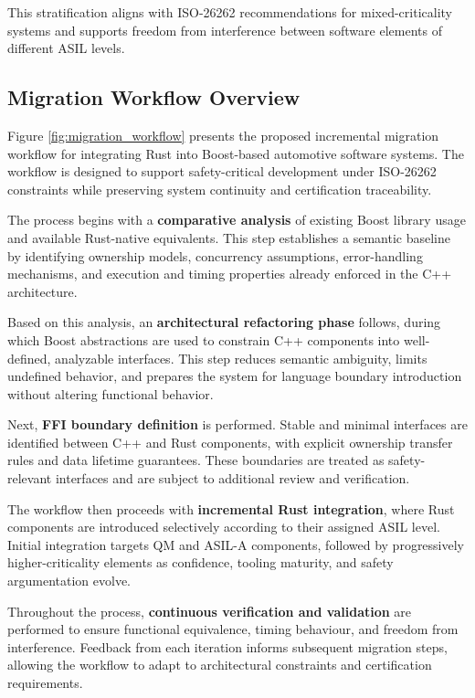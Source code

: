         This stratification aligns with ISO-26262 recommendations for mixed-criticality
        systems and supports freedom from interference between software elements of
        different ASIL levels.


        \subsection{Migration Workflow Overview}

        Figure \ref{fig:migration_workflow} presents the proposed incremental migration
        workflow for integrating Rust into Boost-based automotive software systems.
        The workflow is designed to support safety-critical development under
        ISO-26262 constraints while preserving system continuity and certification
        traceability.

        The process begins with a \textbf{comparative analysis} of existing Boost
        library usage and available Rust-native equivalents. This step establishes a
        semantic baseline by identifying ownership models, concurrency assumptions,
        error-handling mechanisms, and execution and timing properties already enforced in the
        C++ architecture.

        Based on this analysis, an \textbf{architectural refactoring phase} follows,
        during which Boost abstractions are used to constrain C++ components into
        well-defined, analyzable interfaces. This step reduces semantic ambiguity,
        limits undefined behavior, and prepares the system for language boundary
        introduction without altering functional behavior.

        Next, \textbf{\gls{FFI} boundary definition} is performed. Stable and minimal
        interfaces are identified between C++ and Rust components, with explicit
        ownership transfer rules and data lifetime guarantees. These boundaries are
        treated as safety-relevant interfaces and are subject to additional review
        and verification.

        The workflow then proceeds with \textbf{incremental Rust integration}, where
        Rust components are introduced selectively according to their assigned
        \gls{ASIL} level. Initial integration targets QM and ASIL-A components, followed
        by progressively higher-criticality elements as confidence, tooling maturity,
        and safety argumentation evolve.

        Throughout the process, \textbf{continuous verification and validation} are
        performed to ensure functional equivalence, timing behaviour, and freedom
        from interference. Feedback from each iteration informs subsequent migration
        steps, allowing the workflow to adapt to architectural constraints and
        certification requirements.

